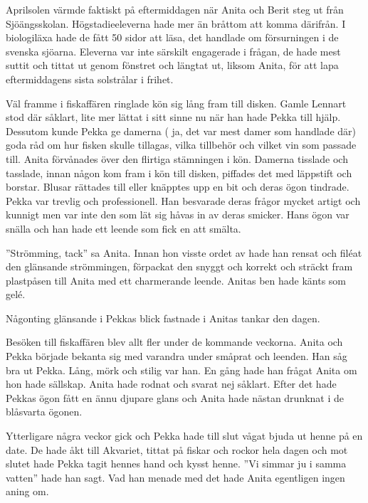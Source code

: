 Aprilsolen värmde faktiskt på eftermiddagen när Anita och Berit steg ut från Sjöängsskolan. Högstadieeleverna hade mer än bråttom att komma därifrån. I biologiläxa hade de fått 50 sidor att läsa, det handlade om försurningen i de svenska sjöarna. Eleverna var inte särskilt engagerade i frågan, de hade mest suttit och tittat ut genom fönstret och längtat ut, liksom Anita, för att lapa eftermiddagens sista solstrålar i frihet. 

Väl framme i fiskaffären ringlade kön sig lång fram till disken. Gamle Lennart stod där såklart, lite mer lättat i sitt sinne nu när han hade Pekka till hjälp. Dessutom kunde Pekka ge damerna ( ja, det var mest damer som handlade där) goda råd om hur fisken skulle tillagas, vilka tillbehör och vilket vin som passade till. Anita förvånades över den flirtiga stämningen i kön. Damerna tisslade och tasslade, innan någon kom fram i kön till disken, piffades det med läppstift och borstar. Blusar rättades till eller knäpptes upp en bit och deras ögon tindrade. Pekka var trevlig och professionell. Han besvarade deras frågor mycket artigt och kunnigt men var inte den som lät sig håvas in av deras smicker. Hans ögon var snälla och han hade ett leende som fick en att smälta. 

”Strömming, tack” sa Anita. Innan hon visste ordet av hade han rensat och filéat den glänsande strömmingen,  förpackat den snyggt och korrekt och sträckt fram plastpåsen till Anita med ett charmerande leende. Anitas ben hade känts som gelé.

Någonting glänsande i Pekkas blick fastnade i Anitas tankar den dagen. 

Besöken till fiskaffären blev allt fler under de kommande veckorna. Anita och Pekka började bekanta sig med varandra under småprat och leenden. Han såg bra ut Pekka. Lång, mörk och stilig var han.  En gång hade han frågat Anita om hon hade sällskap. Anita hade rodnat och svarat nej såklart. Efter det hade Pekkas ögon fått en ännu djupare glans och Anita hade nästan drunknat i de blåsvarta ögonen. 

Ytterligare några veckor gick och Pekka hade till slut vågat bjuda ut henne på en date. De hade åkt till Akvariet, tittat på fiskar och rockor hela dagen och mot slutet hade Pekka tagit hennes hand och kysst henne. ”Vi simmar ju i samma vatten” hade han sagt. Vad han menade med det hade Anita egentligen ingen aning om.

